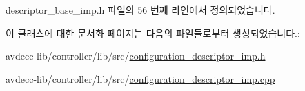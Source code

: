 descriptor\+\_\+base\+\_\+imp.\+h 파일의 56 번째 라인에서 정의되었습니다.



이 클래스에 대한 문서화 페이지는 다음의 파일들로부터 생성되었습니다.\+:\begin{DoxyCompactItemize}
\item 
avdecc-\/lib/controller/lib/src/\hyperlink{configuration__descriptor__imp_8h}{configuration\+\_\+descriptor\+\_\+imp.\+h}\item 
avdecc-\/lib/controller/lib/src/\hyperlink{configuration__descriptor__imp_8cpp}{configuration\+\_\+descriptor\+\_\+imp.\+cpp}\end{DoxyCompactItemize}
